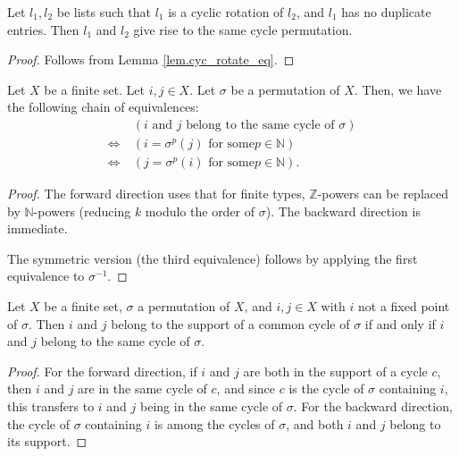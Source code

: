 \begin{lemma}
\label{lem.cyc_eq_of_isRotated}
\leanhelper
\leanok
Let $l_1, l_2$ be lists such that $l_1$ is a cyclic rotation of $l_2$,
and $l_1$ has no duplicate entries. Then $l_1$ and $l_2$ give rise to
the same cycle permutation.
\end{lemma}

\begin{proof}
\leanok
Follows from Lemma \ref{lem.cyc_rotate_eq}.
\end{proof}

\begin{proposition}
\label{prop.perm.cycs.same}
\leantarget
\leanok
Let $X$ be a finite set. Let $i,j\in X$. Let
$\sigma$ be a permutation of $X$. Then, we have the following chain of
equivalences:%
\begin{align*}
\  &  \left(  i\text{ and }j\text{ belong to the same cycle of }\sigma\right)
\\
\Longleftrightarrow\  &  \left(  i=\sigma^{p}\left(  j\right)  \text{ for some
}p\in\mathbb{N}\right) \\
\Longleftrightarrow\  &  \left(  j=\sigma^{p}\left(  i\right)  \text{ for some
}p\in\mathbb{N}\right)  .
\end{align*}
\end{proposition}

\begin{proof}
\leanok
The forward direction uses that for finite types, $\mathbb{Z}$-powers
can be replaced by $\mathbb{N}$-powers (reducing $k$ modulo the order of $\sigma$).
The backward direction is immediate.

The symmetric version (the third equivalence)
follows by applying the first equivalence to $\sigma^{-1}$.
\end{proof}

\begin{lemma}
\label{lem.mem_same_cycle_iff}
\leanhelper
\leanok
Let $X$ be a finite set, $\sigma$ a permutation of $X$, and $i, j \in X$
with $i$ not a fixed point of $\sigma$. Then $i$ and $j$ belong to the
support of a common cycle of $\sigma$ if and only if $i$ and $j$ belong to the
same cycle of $\sigma$.
\end{lemma}

\begin{proof}
\leanok
For the forward direction, if $i$ and $j$ are both in the support of a cycle
$c$, then $i$ and $j$ are in the same cycle of $c$, and since $c$ is the cycle
of $\sigma$ containing $i$, this transfers to $i$ and $j$ being in the same
cycle of $\sigma$.
For the backward direction, the cycle of $\sigma$ containing $i$ is among
the cycles of $\sigma$, and both $i$ and $j$ belong to its support.
\end{proof}

